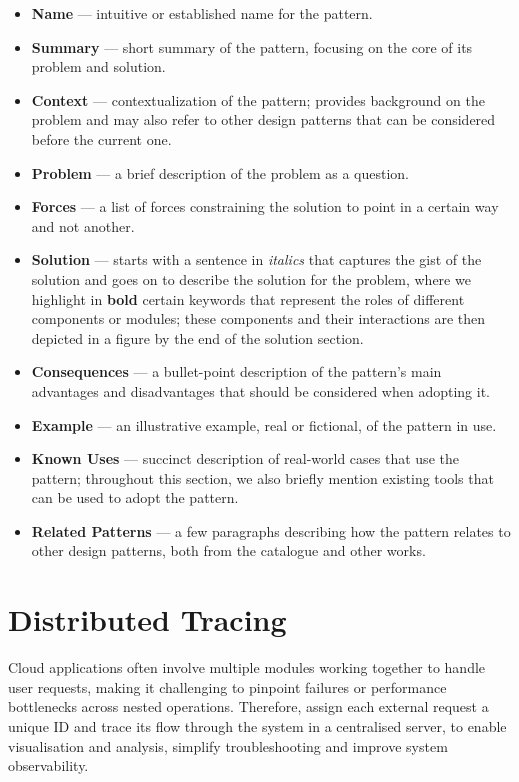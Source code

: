 \documentclass[runningheads]{llncs}
\begin{document}
{\small
\begin{itemize}
    \item \textbf{Name} --- intuitive or established name for the pattern.
    \item \textbf{Summary} --- short summary of the pattern, focusing on the core of its problem and solution.
    \item \textbf{Context} --- contextualization of the pattern; provides background on the problem and may also refer to other design patterns that can be considered before the current one.
    \item \textbf{Problem} --- a brief description of the problem as a question.
    \item \textbf{Forces} --- a list of forces constraining the solution to point in a certain way and not another.
    \item \textbf{Solution} --- starts with a sentence in \textit{italics} that captures the gist of the solution and goes on to describe the solution for the problem, where we highlight in \textbf{bold} certain keywords that represent the roles of different components or modules; these components and their interactions are then depicted in a figure by the end of the solution section.
    \item \textbf{Consequences} --- a bullet-point description of the pattern's main advantages and disadvantages that should be considered when adopting it.
    \item \textbf{Example} --- an illustrative example, real or fictional, of the pattern in use.
    \item \textbf{Known Uses} --- succinct description of real-world cases that use the pattern; throughout this section, we also briefly mention existing tools that can be used to adopt the pattern.
    \item \textbf{Related Patterns} --- a few paragraphs describing how the pattern relates to other design patterns, both from the catalogue and other works.
\end{itemize}
}

\section{Distributed Tracing}\label{pat:distributed-tracing}
Cloud applications often involve multiple modules working together to handle user requests, making it challenging to pinpoint failures or performance bottlenecks across nested operations. Therefore, assign each external request a unique ID and trace its flow through the system in a centralised server, to enable visualisation and analysis, simplify troubleshooting and improve system observability.
\end{document}
